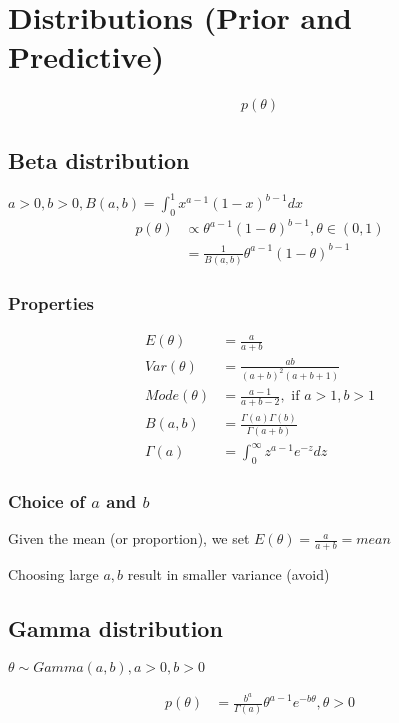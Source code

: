     \section{Distributions (Prior and Predictive)}
    \begin{align*}
        p(\theta)
    \end{align*}

    \subsection{Beta distribution}

    $a > 0, b > 0, B(a, b) = \int_0^1 x^{a-1}(1-x)^{b-1}dx$
    \begin{align*}
        p(\theta) & \propto \theta^{a-1}(1-\theta)^{b-1}
        , \theta \in (0, 1)\\
                  &= \frac{1}{B(a, b)}\theta^{a-1}(1-\theta)^{b-1}
    \end{align*}

    \subsubsection{Properties}
    \begin{align*}
        E(\theta) &= \frac{a}{a+b}\\
        Var(\theta) &= \frac{ab}{(a+b)^2(a+b+1)}\\
        Mode(\theta) &= \frac{a-1}{a+b-2}, \text{ if } a > 1, b>1\\
        B(a, b) &= \frac{\Gamma(a)\Gamma(b)}{\Gamma(a+b)}\\
        \Gamma(a) &= \int_0^\infty z^{a-1}e^{-z}dz
    \end{align*}

    \subsubsection{Choice of $a$ and $b$}

    Given the mean (or proportion), we set
    $E(\theta)=\frac{a}{a+b}=mean$

    Choosing large $a, b$ result in smaller variance (avoid)

    \subsection{Gamma distribution}

    $\theta \sim Gamma(a, b), a > 0, b > 0$

    \begin{align*}
        p(\theta) &=
        \frac{b^a}{\Gamma(a)}\theta^{a-1}e^{-b\theta},
        \theta > 0
    \end{align*}

